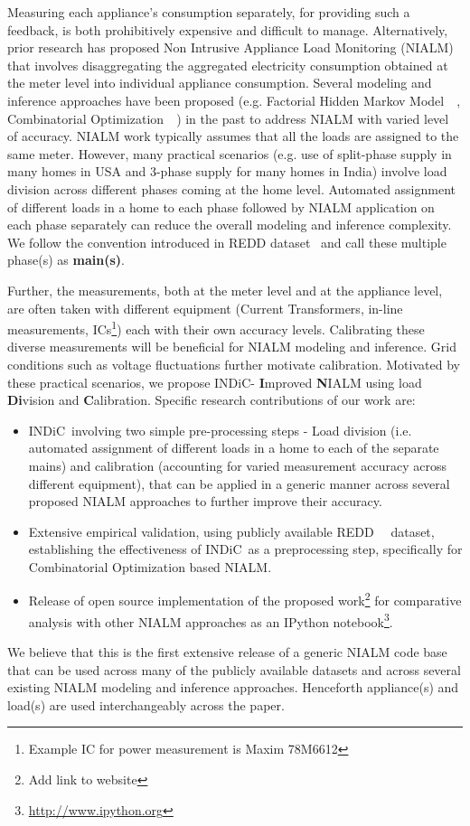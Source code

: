 \documentclass[conference]{IEEEtran}
\newcommand{\indic}{INDiC~}
\newcommand{\indicns}{INDiC}
\begin{document}
\noindent Measuring each appliance's consumption separately, for providing such a feedback, is both prohibitively expensive and difficult to manage. Alternatively, prior research has proposed Non Intrusive Appliance Load Monitoring (NIALM) that involves disaggregating the aggregated electricity consumption obtained at the meter level into individual appliance consumption. Several modeling and inference approaches have been proposed (e.g. Factorial Hidden Markov Model~~\cite{Ghahramani_97a}, Combinatorial Optimization~~\cite{hart}) in the past to address NIALM with varied level of accuracy. NIALM work typically assumes that all the loads are assigned to the same meter. However, many practical scenarios (e.g. use of split-phase supply in many homes in USA and 3-phase supply for many homes in India) involve load division across different phases coming at the home level. Automated assignment of different loads in a home to each phase followed by NIALM application on each phase separately can reduce the overall modeling and inference complexity. We follow the convention introduced in REDD dataset~\cite{redd} and call these multiple phase(s) as \textbf{main(s)}.

\noindent Further, the measurements, both at the meter level and at the appliance level, are often taken with different equipment (Current Transformers, in-line measurements, ICs\footnote{Example IC for power measurement is Maxim 78M6612}) each with their own accuracy levels. Calibrating these diverse measurements will be beneficial for NIALM modeling and inference. Grid conditions such as voltage fluctuations further motivate calibration. Motivated by these practical scenarios, we propose \indicns - \textbf{I}mproved \textbf{N}IALM using load \textbf{Di}vision and \textbf{C}alibration. Specific research contributions of our work are:
\begin{itemize}
\item \indic involving two simple pre-processing steps - Load division (i.e. automated assignment of different loads in a home to each of the separate mains) and calibration (accounting for varied measurement accuracy across different equipment), that can be applied in a generic manner across several proposed NIALM approaches to further improve their accuracy. 
\item Extensive empirical validation, using publicly available REDD~~\cite{redd} dataset, establishing the effectiveness of \indic as a preprocessing step, specifically for Combinatorial Optimization based NIALM. 
\item Release of open source implementation of the proposed work\footnote{Add link to website} for comparative analysis with other NIALM approaches as an IPython notebook\footnote{\url{http://www.ipython.org}}. 
\end{itemize}
\noindent We believe that this is the first extensive release of a generic NIALM code base that can be used across many of the publicly available datasets and across several existing NIALM modeling and inference approaches. Henceforth appliance(s) and load(s) are used interchangeably across the paper.
\end{document}
